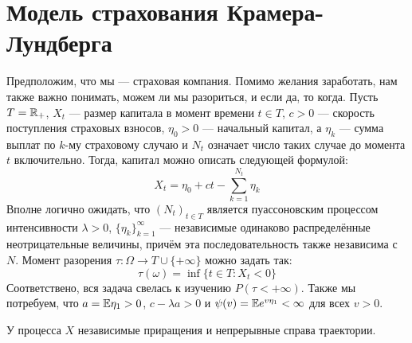 \section{Модель страхования Крамера-Лундберга}

\begin{problem}
	Предположим, что мы --- страховая компания. Помимо желания заработать, нам также важно понимать, можем ли мы разориться, и если да, то когда. Пусть $T = \mathbb{R}_+$, $X_t$ --- размер капитала в момент времени $t \in T$, $c > 0$ --- скорость поступления страховых взносов, $\eta_0 > 0$ --- начальный капитал, а $\eta_k$ --- сумма выплат по $k$-му страховому случаю и $N_t$ означает число таких случае до момента $t$ включительно. Тогда, капитал можно описать следующей формулой:
	\[
		X_t = \eta_0 + ct - \sum_{k = 1}^{N_t} \eta_k
	\]
	Вполне логично ожидать, что $(N_t)_{t \in T}$ является пуассоновским процессом интенсивности $\lambda > 0$, $\{\eta_k\}_{k = 1}^\infty$ --- независимые одинаково распределённые неотрицательные величины, причём эта последовательность также независима с $N$. Момент разорения $\tau \colon \Omega \to T \cup \{+\infty\}$ можно задать так:
	\[
		\tau(\omega) = \inf \{t \in T \colon X_t < 0\}
	\]
	Соответствено, вся задача свелась к изучению $P(\tau < +\infty)$. Также мы потребуем, что $a = \mathbb{E}\eta_1 > 0$, $c - \lambda a > 0$ и $\psi(v) = \mathbb{E} e^{v\eta_1} < \infty$ для всех $v > 0$.
\end{problem}

\begin{proposition}
	У процесса $X$ независимые приращения и непрерывные справа траектории.
\end{proposition}

